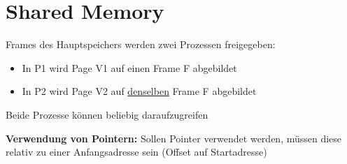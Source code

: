 \section{Shared Memory}
Frames des Hauptspeichers werden zwei Prozessen freigegeben:
\begin{itemize}
    \item In P1 wird Page V1 auf einen Frame F abgebildet
    \item In P2 wird Page V2 auf \underline{denselben} Frame F abgebildet
\end{itemize}
Beide Prozesse können beliebig daraufzugreifen

\textbf{Verwendung von Pointern: }Sollen Pointer verwendet werden, müssen diese relativ zu einer Anfangsadresse sein
(Offset auf Startadresse)






